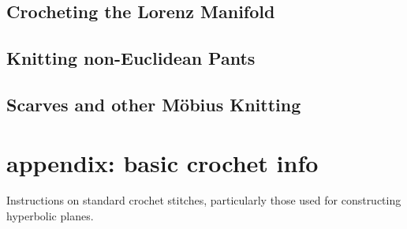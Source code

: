 \documentclass{article}
\begin{document}
\subsection{Crocheting the Lorenz Manifold \cite{crochetlorenz}}
\subsection{Knitting non-Euclidean Pants \cite{makingmath}}
\subsection{Scarves and other M\"obius Knitting \cite{magicalknitting}\cite{magicalknitting2}}

\section{appendix: basic crochet info}
Instructions on standard crochet stitches, particularly those used for constructing hyperbolic planes. \cite{happyhooker}

\newpage


\end{document}
